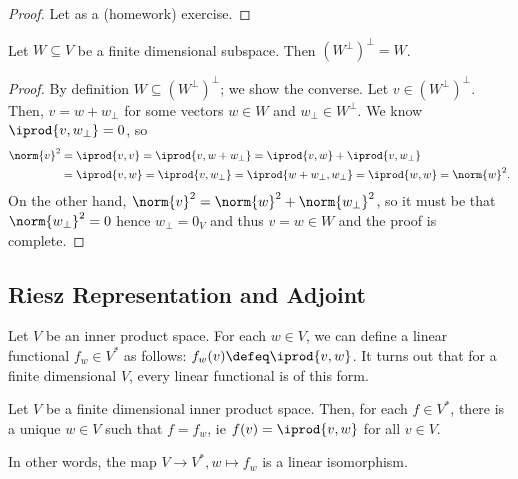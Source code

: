 \begin{proof}
    Let as a (homework) exercise.
\end{proof}

\begin{corollary}
    Let $W \subseteq V$ be a finite dimensional subspace. Then $(W^\perp)^\perp = W$.
\end{corollary}

\begin{proof}
    By definition $W \subseteq (W^\perp)^\perp$; we show the converse. Let $v \in (W^\perp)^\perp$. Then, $v= w + w_\perp$ for some vectors $w \in W$ and $w_\perp \in W^\perp$. We know $\iprod{v, w_\perp} = 0$, so \begin{align*}
    \norm{v}^2 &= \iprod{v, v}     = \iprod{v, w + w_\perp} = \iprod{v, w} + \iprod{v, w_\perp} \\
    &= \iprod{v, w} = \iprod{v, w_\perp} = \iprod{w + w_\perp, w_\perp} = \iprod{w, w} = \norm{w}^2.
    \end{align*}
    On the other hand, $\norm{v}^2 = \norm{w}^2 + \norm{w_\perp}^2$, so it must be that $\norm{w_\perp}^2 = 0$ hence $w_\perp = 0_V$ and thus $v = w \in W$ and the proof is complete.
\end{proof}

\subsection{Riesz Representation and Adjoint}

Let $V$ be an inner product space. For each $w \in V$, we can define a linear functional $f_w \in V^\ast$ as follows: $f_w(v) \defeq \iprod{v, w}$. It turns out that for a finite dimensional $V$, every linear functional is of this form.

\begin{theorem}\label{thm:riesz}
    Let $V$ be a finite dimensional inner product space. Then, for each $f \in V^\ast$, there is a unique $w \in V$ such that $f = f_w$, ie $f(v) = \iprod{v, w}$ for all $v \in V$. 

    In other words, the map $V \to V^\ast, w \mapsto f_w$ is a linear isomorphism.
\end{theorem}

